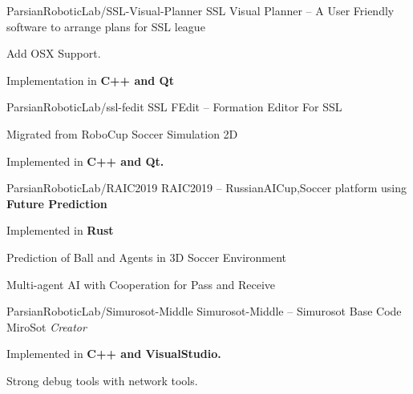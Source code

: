 
\begin{cventries}
  \cventry
    {ParsianRoboticLab/SSL-Visual-Planner} %
    {SSL Visual Planner -- A User Friendly software to arrange plans for SSL league} %
    {} %
    {} %
    {
      \begin{cvitems} %
        \item {Add OSX Support.}
        \item {Implementation in \textbf{C++ and Qt}}
      \end{cvitems}
    }

  \cventry
    {ParsianRoboticLab/ssl-fedit} %
    {SSL FEdit -- Formation Editor For SSL} %
    {} %
    {} %
    {
      \begin{cvitems} %
        \item {Migrated from RoboCup Soccer Simulation 2D}
        \item {Implemented in \textbf{C++ and Qt.}}
      \end{cvitems}
    }

  \cventry
    {ParsianRoboticLab/RAIC2019} %
    {RAIC2019 -- RussianAICup,Soccer platform using \textbf{Future Prediction}} %
    {} %
    {} %
    {
      \begin{cvitems} %
        \item {Implemented in \textbf{Rust}}
        \item {Prediction of Ball and Agents in 3D Soccer Environment}
        \item {Multi-agent AI with Cooperation for Pass and Receive}
      \end{cvitems}
    }

  \cventry
    {ParsianRoboticLab/Simurosot-Middle} %
    {Simurosot-Middle -- Simurosot Base Code MiroSot} %
    {\textit{Creator}} %
    {} %
    {
      \begin{cvitems} %
        \item {Implemented in \textbf{C++ and VisualStudio.}}
        \item {Strong debug tools with network tools.}
      \end{cvitems}
    }
    

\end{cventries}
